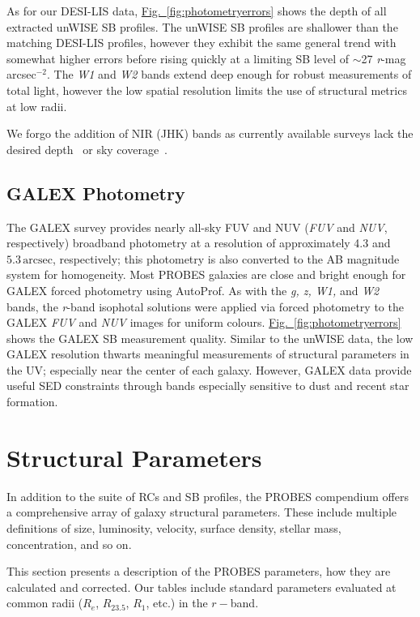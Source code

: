 \documentclass[twocolumn]{aastex631}
\newcommand{\Fig}[1]{{\protect\hyperref[fig:#1]{Fig.~\ref*{fig:#1}}}}
\newcommand{\wunits}[2]{\ensuremath{#1\,\text{#2}}}
\begin{document}
As for our DESI-LIS data, \Fig{photometryerrors} shows the depth of all extracted unWISE SB profiles.
The unWISE SB profiles are shallower than the matching DESI-LIS profiles, however they exhibit the same general trend with somewhat higher errors before rising quickly at a limiting SB level of $\sim$27 {\it r}-mag arcsec$^{-2}$.
The {\it W1} and {\it W2} bands extend deep enough for robust measurements of total light, however the low spatial resolution limits the use of structural metrics at low radii.

We forgo the addition of NIR (JHK) bands as currently available surveys lack the desired depth~\citep{Skrutskie2006} or sky coverage~\citep{Lawrence2007}.

\subsection{GALEX Photometry}\label{sec:galexphotometry}

The GALEX survey provides nearly all-sky FUV and NUV ({\it FUV} and {\it NUV}, respectively) broadband photometry at a resolution of approximately 4.3 and \wunits{5.3}{arcsec}, respectively; this photometry is also converted to the AB magnitude system for homogeneity. 
Most PROBES galaxies are close and bright enough for GALEX forced photometry using AutoProf.
As with the {\it g, z, W1,} and {\it W2} bands, the {\it r}-band isophotal solutions were applied via forced photometry to the GALEX {\it FUV} and {\it NUV} images for uniform colours.
\Fig{photometryerrors} shows the GALEX SB measurement quality.
Similar to the unWISE data, the low GALEX resolution thwarts meaningful measurements of structural parameters in the UV; especially near the center of each galaxy. 
However, GALEX data provide useful SED constraints through bands especially sensitive to dust and recent star formation.

\section{Structural Parameters}\label{sec:structuralparameters}

In addition to the suite of RCs and SB profiles, the PROBES compendium offers a comprehensive array of galaxy structural parameters.
These include multiple definitions of size, luminosity, velocity, surface density, stellar mass, concentration, and so on.

This section presents a description of the PROBES parameters, how they are calculated and corrected.
Our tables include standard parameters evaluated at common radii ($R_{e}$, $R_{23.5}$, $R_{1}$, etc.) in the $r-$band.
\end{document}

